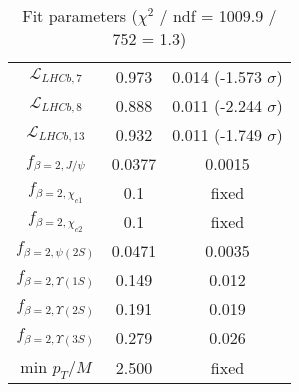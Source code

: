 \begin{table}[h!]
\begin{tabular}{c|c|c}
$\mathcal L_{LHCb,7}$ & 0.973 & 0.014 (-1.573 $\sigma$) \\
$\mathcal L_{LHCb,8}$ & 0.888 & 0.011 (-2.244 $\sigma$) \\
$\mathcal L_{LHCb,13}$ & 0.932 & 0.011 (-1.749 $\sigma$) \\
$f_{\beta=2,J/\psi}$ & 0.0377 & 0.0015 \\
$f_{\beta=2,\chi_{c1}}$ & 0.1 & fixed \\
$f_{\beta=2,\chi_{c2}}$ & 0.1 & fixed \\
$f_{\beta=2,\psi(2S)}$ & 0.0471 & 0.0035 \\
$f_{\beta=2,\Upsilon(1S)}$ & 0.149 & 0.012 \\
$f_{\beta=2,\Upsilon(2S)}$ & 0.191 & 0.019 \\
$f_{\beta=2,\Upsilon(3S)}$ & 0.279 & 0.026 \\
min $p_T/M$ & 2.500 & fixed \\
\end{tabular}
\caption{Fit parameters ($\chi^2$ / ndf = 1009.9 / 752 = 1.3)}
\end{table}
